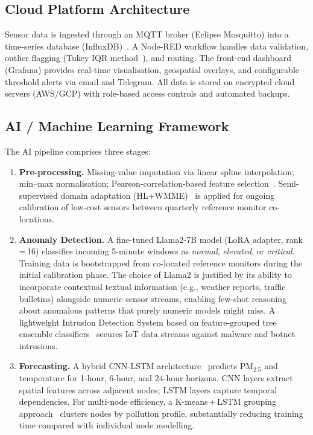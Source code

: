 \documentclass[12pt,a4paper]{report}
\begin{document}
\subsection{Cloud Platform Architecture}
Sensor data is ingested through an MQTT broker (Eclipse Mosquitto) into a time-series database (InfluxDB)~\cite{yasin2022}. A Node-RED workflow handles data validation, outlier flagging (Tukey IQR method~\cite{garcia2022smart}), and routing. The front-end dashboard (Grafana) provides real-time visualisation, geospatial overlays, and configurable threshold alerts via email and Telegram. All data is stored on encrypted cloud servers (AWS/GCP) with role-based access controls and automated backups.

\subsection{AI / Machine Learning Framework}
\label{sec:ai_pipeline}
The AI pipeline comprises three stages:
\begin{enumerate}[leftmargin=*, label=\arabic*., itemsep=4pt]
  \item \textbf{Pre-processing.} Missing-value imputation via linear spline interpolation; min--max normalisation; Pearson-correlation-based feature selection~\cite{bekkar2021}. Semi-supervised domain adaptation (HL+WMME)~\cite{dey2022} is applied for ongoing calibration of low-cost sensors between quarterly reference monitor co-locations.
  \item \textbf{Anomaly Detection.} A fine-tuned Llama2-7B model (LoRA adapter, rank\,=\,16) classifies incoming 5-minute windows as \textit{normal}, \textit{elevated}, or \textit{critical}. Training data is bootstrapped from co-located reference monitors during the initial calibration phase. The choice of Llama2 is justified by its ability to incorporate contextual textual information (e.g., weather reports, traffic bulletins) alongside numeric sensor streams, enabling few-shot reasoning about anomalous patterns that purely numeric models might miss. A lightweight Intrusion Detection System based on feature-grouped tree ensemble classifiers~\cite{he2024} secures IoT data streams against malware and botnet intrusions.
  \item \textbf{Forecasting.} A hybrid CNN-LSTM architecture~\cite{bekkar2021} predicts PM$_{2.5}$ and temperature for 1-hour, 6-hour, and 24-hour horizons. CNN layers extract spatial features across adjacent nodes; LSTM layers capture temporal dependencies. For multi-node efficiency, a K-means\,+\,LSTM grouping approach~\cite{ariff2023} clusters nodes by pollution profile, substantially reducing training time compared with individual node modelling.
\end{enumerate}
\end{document}
